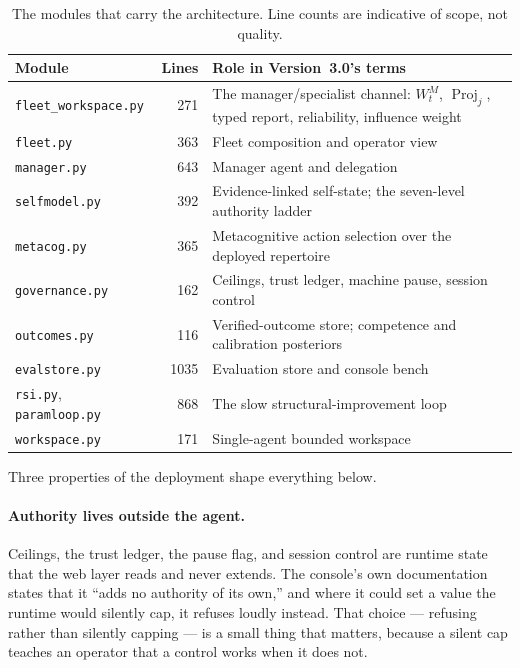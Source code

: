 \documentclass[11pt]{article}
\newcommand{\code}[1]{\texttt{\small #1}}
\newcommand{\op}[1]{\operatorname{#1}}
\begin{document}
\begin{table}[h]
\centering\small
\caption{The modules that carry the architecture. Line counts are indicative of scope, not quality.}
\label{tab:modules}
\begin{tabular}{@{}lrL{8.3cm}@{}}
\toprule
\textbf{Module} & \textbf{Lines} & \textbf{Role in Version~3.0's terms} \\
\midrule
\code{fleet\_\allowbreak{}workspace.py} & 271 & The manager/specialist channel: $W^M_t$, $\op{Proj}_j$, typed report, reliability, influence weight \\
\code{fleet.py} & 363 & Fleet composition and operator view \\
\code{manager.py} & 643 & Manager agent and delegation \\
\code{selfmodel.py} & 392 & Evidence-linked self-state; the seven-level authority ladder \\
\code{metacog.py} & 365 & Metacognitive action selection over the deployed repertoire \\
\code{governance.py} & 162 & Ceilings, trust ledger, machine pause, session control \\
\code{outcomes.py} & 116 & Verified-outcome store; competence and calibration posteriors \\
\code{evalstore.py} & 1035 & Evaluation store and console bench \\
\code{rsi.py}, \code{paramloop.py} & 868 & The slow structural-improvement loop \\
\code{workspace.py} & 171 & Single-agent bounded workspace \\
\bottomrule
\end{tabular}
\end{table}

Three properties of the deployment shape everything below.

\paragraph{Authority lives outside the agent.} Ceilings, the trust ledger, the pause flag, and session control are runtime state that the web layer reads and never extends. The console's own documentation states that it ``adds no authority of its own,'' and where it could set a value the runtime would silently cap, it refuses loudly instead. That choice --- refusing rather than silently capping --- is a small thing that matters, because a silent cap teaches an operator that a control works when it does not.
\end{document}
